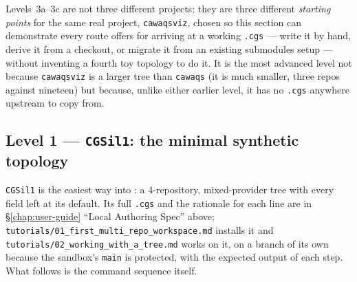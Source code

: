 Levels~3a--3c are not three different projects: they are three different
\emph{starting points} for the same real project, \texttt{cawaqsviz}, chosen
so this section can demonstrate every route \cgspkg{} offers for arriving
at a working \texttt{.cgs} --- write it by hand, derive it from a checkout,
or migrate it from an existing submodules setup --- without inventing a
fourth toy topology to do it. It is the most advanced level not because
\texttt{cawaqsviz} is a larger tree than \texttt{cawaqs} (it is much
smaller, three repos against nineteen) but because, unlike either earlier
level, it has no \texttt{.cgs} anywhere upstream to copy from.

\subsection{Level 1 --- \texttt{CGSil1}: the minimal synthetic topology}

\texttt{CGSil1} is the easiest way into \cgspkg{}: a 4-repository,
mixed-provider tree with every field left at its default. Its full
\texttt{.cgs} and the rationale for each line are in \S\ref{chap:user-guide}
``Local Authoring Spec'' above;
\texttt{tutorials/01\_first\_multi\_repo\_workspace.md} installs it and
\texttt{tutorials/02\_working\_with\_a\_tree.md} works on it, on a branch
of its own because the sandbox's \texttt{main} is protected, with the
expected output of each step. What follows is the command sequence itself.

